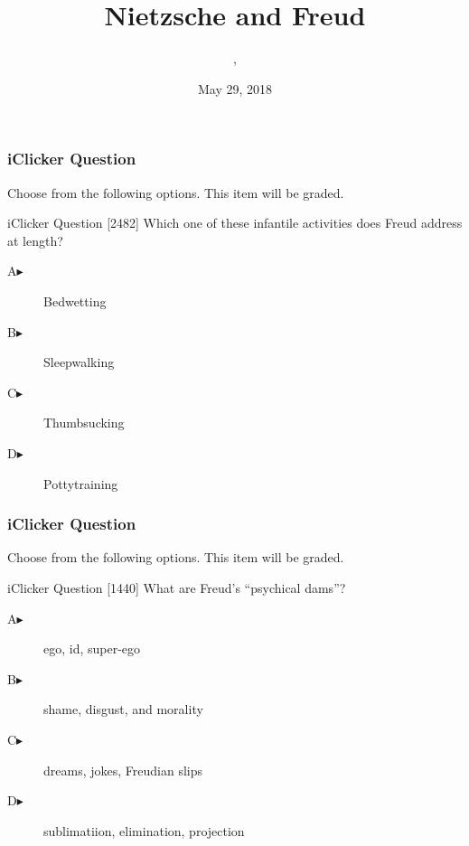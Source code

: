 \documentclass[xcolor=dvipsnames]{beamer}
\title{Nietzsche and Freud}
\subtitle{{\CourseNumber}, {\CourseInst}}
\author{\CourseName}
\date{May 29, 2018}
\begin{document}
\begin{frame}
  \titlepage
\end{frame}

\begin{frame}
  \frametitle{iClicker Question}
Choose from the following options. This item will be graded.
\begin{block}{iClicker Question}
[2482] Which one of these infantile activities does Freud address at length?
\end{block}
\begin{description}
\item[A\hspace{.2in}$\blacktriangleright$] Bedwetting
\item[B\hspace{.2in}$\blacktriangleright$] Sleepwalking
\item[C\hspace{.2in}$\blacktriangleright$] Thumbsucking
\item[D\hspace{.2in}$\blacktriangleright$] Pottytraining
\end{description}
\end{frame}

\begin{frame}
  \frametitle{iClicker Question}
Choose from the following options. This item will be graded.
\begin{block}{iClicker Question}
[1440] What are Freud's ``psychical dams''?
\end{block}
\begin{description}
\item[A\hspace{.2in}$\blacktriangleright$] ego, id, super-ego
\item[B\hspace{.2in}$\blacktriangleright$] shame, disgust, and morality
\item[C\hspace{.2in}$\blacktriangleright$] dreams, jokes, Freudian slips
\item[D\hspace{.2in}$\blacktriangleright$] sublimatiion, elimination, projection
\end{description}
\end{frame}
\end{document}
